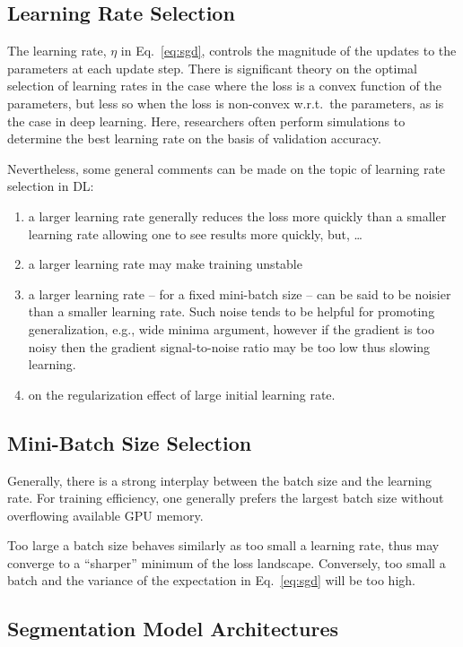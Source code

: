 \documentclass[11pt]{article} %
\begin{document}
\subsection{Learning Rate Selection}

The learning rate, $\eta$ in Eq.~\eqref{eq:sgd}, controls the magnitude of the 
updates to the parameters at each update step. There is significant theory on
the optimal selection of learning rates in the case where the loss is a convex
function of the parameters, but less so when the loss is non-convex w.r.t.~the
parameters, as is the case in deep learning. Here, researchers often perform
simulations to determine the best learning rate on the basis of validation 
accuracy.

Nevertheless, some general comments can be made on the topic of learning rate 
selection in DL: 

\begin{enumerate}
\item a larger learning rate generally reduces the loss more quickly than a
smaller learning rate allowing one to see results more quickly, but, \dots
\item a larger learning rate may make training unstable
\item a larger learning rate -- for a fixed mini-batch size -- can be said to
be noisier than a smaller learning rate. Such noise tends to be helpful for 
promoting generalization, e.g., wide minima argument, however if the gradient 
is too noisy then the gradient signal-to-noise ratio may be too low thus 
slowing learning.
\item on the regularization effect of large initial learning rate.
\end{enumerate}

\subsection{Mini-Batch Size Selection}

Generally, there is a strong interplay between the batch size and the learning
rate. For training efficiency, one generally prefers the largest batch size
without overflowing available GPU memory.

Too large a batch size behaves similarly as too small a learning rate, thus may 
converge to a ``sharper'' minimum of the loss landscape. Conversely, too small 
a batch and the variance of the expectation in Eq.~\eqref{eq:sgd} will be too 
high.

\subsection{Segmentation Model Architectures}
\end{document}
